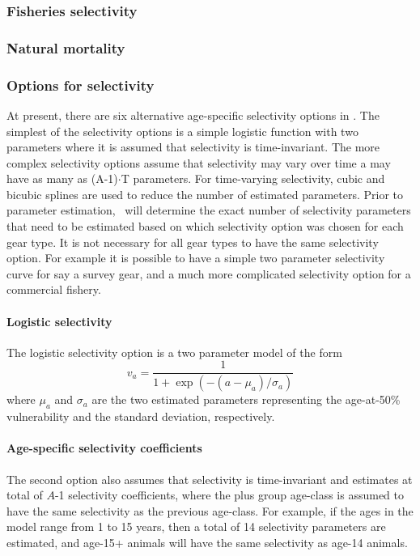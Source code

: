 

\subsubsection{Fisheries selectivity} %
\label{ssub:fisheries_selectivity}


\subsubsection{Natural mortality} %
\label{ssub:natural_mortality}



\subsubsection{Options for selectivity}\label{ModelDocSelectivity}

At present, there are six alternative age-specific selectivity options in \iscam.  The simplest of the selectivity options is a simple logistic function with two parameters where it is assumed that selectivity is time-invariant.  The more complex selectivity options assume that selectivity may vary over time a may have as many as (A-1)$\cdot$T parameters.  For time-varying selectivity, cubic and bicubic splines are used to reduce the number of estimated parameters.  Prior to parameter estimation, \iscam\ will determine the exact number of selectivity parameters that need to be estimated based on which selectivity option was chosen for each gear type.  It is not necessary for all gear types to have the same selectivity option.  For example it is possible to have a simple two parameter selectivity curve for say a survey gear, and a much more complicated selectivity option for a commercial fishery.

\paragraph{Logistic selectivity} 
The logistic selectivity option is a two parameter model of the form
\[
v_a = \frac{1}{1+ \exp{(-(a-\mu_{a})/\sigma_a)}}
\]
where $\mu_a$ and $\sigma_a$ are the two estimated parameters representing the age-at-50\% vulnerability and the standard deviation, respectively.

\paragraph{Age-specific selectivity coefficients}
The second option also assumes that selectivity is time-invariant and estimates at total of $A$-1 selectivity coefficients, where the plus group age-class is assumed to have the same selectivity as the previous age-class.  For example, if the ages in the model range from 1 to 15 years, then a total of 14 selectivity parameters are estimated, and age-15+ animals will have the same selectivity as age-14 animals.

